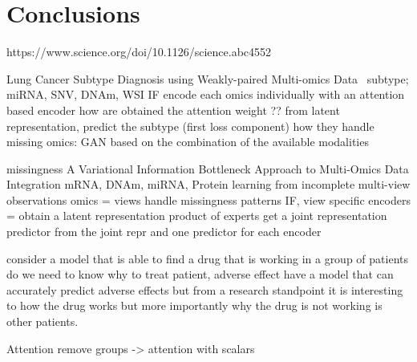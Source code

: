 \documentclass[../main.tex]{subfiles}
\begin{document}
\chapter{Conclusions}
\minitocpage

https://www.science.org/doi/10.1126/science.abc4552

Lung Cancer Subtype Diagnosis using Weakly-paired Multi-omics Data~\cite{Wang2022}
subtype; miRNA, SNV, DNAm, WSI
IF
encode each omics individually with an attention based encoder
how are obtained the attention weight ??
from latent representation, predict the subtype (first loss component)
how they handle missing omics: GAN based on the combination of the available modalities


missingness
A Variational Information Bottleneck Approach to Multi-Omics Data Integration
\cite{Lee2021AVI}
mRNA, DNAm, miRNA, Protein
learning from incomplete multi-view observations
omics = views handle missingness patterns
IF, view specific encoders = obtain a latent representation
product of experts get a joint representation
predictor from the joint repr and one predictor for each encoder


consider a model that is able to find a drug that is working in a group of patients
do we need to know why to treat patient, adverse effect have a model that can accurately predict adverse effects
but from a research standpoint it is interesting to how the drug works but more importantly why the drug is not working is other patients. 

Attention remove groups -> attention with scalars
\end{document}
